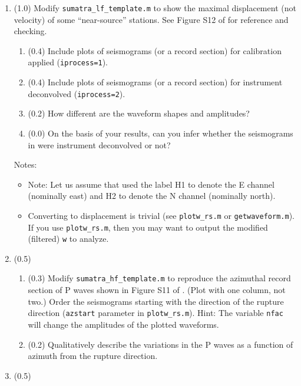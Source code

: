 \documentclass[11pt,titlepage,fleqn]{article}
\begin{document}
\begin{enumerate}
\item (1.0) Modify \verb+sumatra_lf_template.m+ to show the maximal displacement (not velocity) of some ``near-source'' stations. See Figure S12 of \citet{Ammon2005} for reference and checking.

%
\begin{enumerate}
\item (0.4) Include plots of seismograms (or a record section) for calibration applied (\verb+iprocess=1+).
\item (0.4) Include plots of seismograms (or a record section) for instrument deconvolved (\verb+iprocess=2+).
\item (0.2) How different are the waveform shapes and amplitudes?
\item (0.0) On the basis of your results, can you infer whether the seismograms in \citet{Ammon2005} were instrument deconvolved or not?
\end{enumerate}
%
Notes:
%
\begin{itemize}
\item Note: Let us assume that \citet{Ammon2005} used the label H1 to denote the E channel (nominally east) and H2 to denote the N channel (nominally north).

\item Converting to displacement is trivial (see \verb+plotw_rs.m+ or \verb+getwaveform.m+). If you use \verb+plotw_rs.m+, then you may want to output the modified (\ie filtered) \verb+w+ to analyze.

\end{itemize}


\item (0.5) 
%
\begin{enumerate}
\item (0.3) Modify \verb+sumatra_hf_template.m+ to reproduce the azimuthal record section of P waves shown in Figure S11 of \citet{Ammon2005}. (Plot with one column, not two.) Order the seismograms starting with the direction of the rupture direction (\verb+azstart+ parameter in \verb+plotw_rs.m+).
Hint: The variable \verb+nfac+ will change the amplitudes of the plotted waveforms.
\item (0.2) Qualitatively describe the variations in the P waves as a function of azimuth from the rupture direction.
\end{enumerate}


\item (0.5) 

\end{enumerate}
\end{document}
